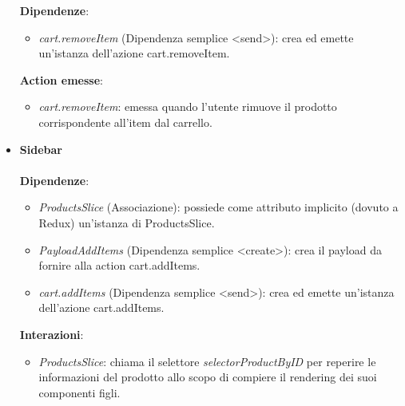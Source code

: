 \begin{itemize}
	\textbf{Dipendenze}: 
	\begin{itemize}
		\item \textit{cart.removeItem} (Dipendenza semplice \textless send\textgreater): crea ed emette un'istanza dell'azione cart.removeItem.
	\end{itemize}
	\textbf{Action emesse}:
	\begin{itemize}
		\item \textit{cart.removeItem}: emessa quando l'utente rimuove il prodotto corrispondente all'item dal carrello.
	\end{itemize}
	\item \textbf{Sidebar}
	\\\\
	\textbf{Dipendenze}:
	\begin{itemize}
		\item \textit{ProductsSlice} (Associazione): possiede come attributo implicito (dovuto a Redux) un'istanza di ProductsSlice.
		\item \textit{PayloadAddItems} (Dipendenza semplice \textless create\textgreater): crea il payload da fornire alla action cart.addItems.
		\item \textit{cart.addItems} (Dipendenza semplice \textless send\textgreater): crea ed emette un'istanza dell'azione cart.addItems.
		\end{itemize}
		\textbf{Interazioni}:
		\begin{itemize}
			\item \textit{ProductsSlice}: chiama il selettore \textit{selectorProductByID} per reperire le informazioni del prodotto 
			allo scopo di compiere il rendering dei suoi componenti figli.
		\end{itemize}
\end{itemize}
	
